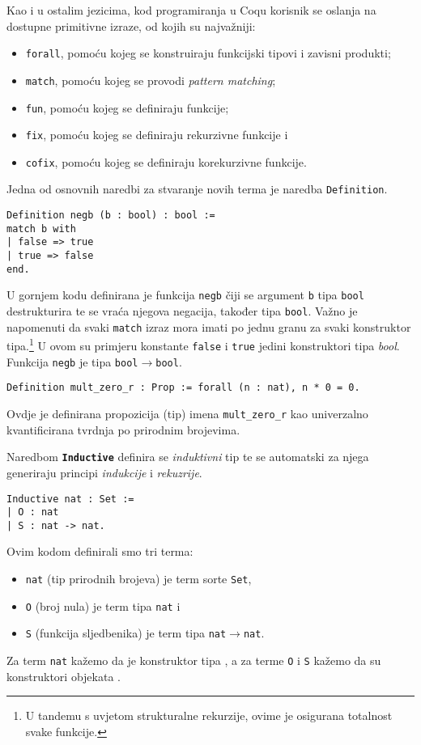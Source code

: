 Kao i u ostalim jezicima, kod programiranja u Coqu korisnik se oslanja na dostupne primitivne izraze,
od kojih su najvažniji:
\begin{itemize}
\item \texttt{forall}, pomoću kojeg se konstruiraju funkcijski tipovi i zavisni produkti;
\item \texttt{match}, pomoću kojeg se provodi \textit{pattern matching};
\item \texttt{fun}, pomoću kojeg se definiraju funkcije;
\item \texttt{fix}, pomoću kojeg se definiraju rekurzivne funkcije i
\item \texttt{cofix}, pomoću kojeg se definiraju korekurzivne funkcije.
\end{itemize}

Jedna od osnovnih naredbi za stvaranje novih terma je naredba \texttt{Definition}.
\begin{verbatim}
Definition negb (b : bool) : bool :=
match b with
| false => true
| true => false
end.
\end{verbatim}
\noindent U gornjem kodu definirana je funkcija \texttt{negb} čiji se argument \texttt{b} tipa \texttt{bool} destrukturira te se vraća njegova negacija, također tipa \texttt{bool}.
Važno je napomenuti da svaki \texttt{match} izraz mora imati po jednu granu za svaki konstruktor tipa.\footnote{U tandemu s uvjetom strukturalne rekurzije, ovime je osigurana totalnost svake funkcije.}
U ovom su primjeru konstante \texttt{false} i \texttt{true} jedini konstruktori tipa \textit{bool}.
Funkcija \texttt{negb} je tipa \texttt{bool\(\rightarrow\)bool}.
\begin{verbatim}
Definition mult_zero_r : Prop := forall (n : nat), n * 0 = 0.
\end{verbatim}
Ovdje je definirana propozicija (tip) imena \texttt{mult\_zero\_r} kao univerzalno kvantificirana tvrdnja po prirodnim brojevima.

Naredbom \texttt{\textbf{Inductive}} definira se \textit{induktivni} tip te se automatski za njega generiraju principi \textit{indukcije} i \textit{rekuzrije}.
\begin{verbatim}
Inductive nat : Set :=
| O : nat
| S : nat -> nat.
\end{verbatim}
Ovim kodom definirali smo tri terma:
\begin{itemize}
\item \texttt{nat} (tip prirodnih brojeva) je term sorte \texttt{Set},
\item \texttt{O} (broj nula) je term tipa \texttt{nat} i
\item \texttt{S} (funkcija sljedbenika) je term tipa \texttt{nat\(\rightarrow\)nat}.
\end{itemize}
\noindent Za term \texttt{nat} kažemo da je konstruktor tipa , a za terme \texttt{O} i \texttt{S} kažemo da su konstruktori objekata .

